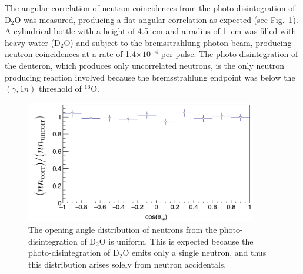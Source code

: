 The angular correlation of neutron coincidences from the photo-disintegration of D$_{2}$O was measured, producing a flat angular correlation as expected (see Fig.~\ref{fig:D2Otheta_nn}).
A cylindrical bottle with a height of 4.5~cm and a radius of 1~cm was filled with heavy water 
(D$_{2}$O) and subject to the bremsstrahlung photon beam, producing neutron coincidences at a rate of 1.4$\times10^{-4}$ per pulse.
The photo-disintegration of the deuteron, which produces only uncorrelated neutrons, is the only neutron producing reaction involved because the bremsstrahlung endpoint was below the $(\gamma, 1n)$ threshold of $^{16}$O.
\begin{figure}[h]
\includegraphics[width=0.9\textwidth]{Content/Methods/D2Otheta_nn.png}
\caption{The opening angle distribution of neutrons from the photo-disintegration of D$_{2}$O is uniform.
This is expected because the photo-disintegration of D$_{2}$O emits only a single neutron, and thus this distribution arises solely from neutron accidentals.}
\label{fig:D2Otheta_nn}
\end{figure}

\FloatBarrier
